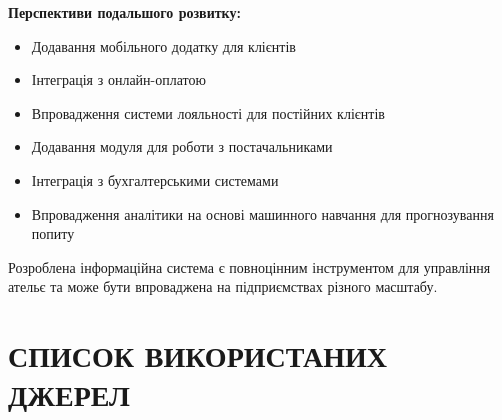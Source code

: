 \documentclass[14pt,a4paper]{extarticle}
\begin{document}
\textbf{Перспективи подальшого розвитку:}

\begin{itemize}
    \item Додавання мобільного додатку для клієнтів
    \item Інтеграція з онлайн-оплатою
    \item Впровадження системи лояльності для постійних клієнтів
    \item Додавання модуля для роботи з постачальниками
    \item Інтеграція з бухгалтерськими системами
    \item Впровадження аналітики на основі машинного навчання для прогнозування попиту
\end{itemize}

Розроблена інформаційна система є повноцінним інструментом для управління ательє та може бути впроваджена на підприємствах різного масштабу.

\newpage
\section{СПИСОК ВИКОРИСТАНИХ ДЖЕРЕЛ}
\end{document}
